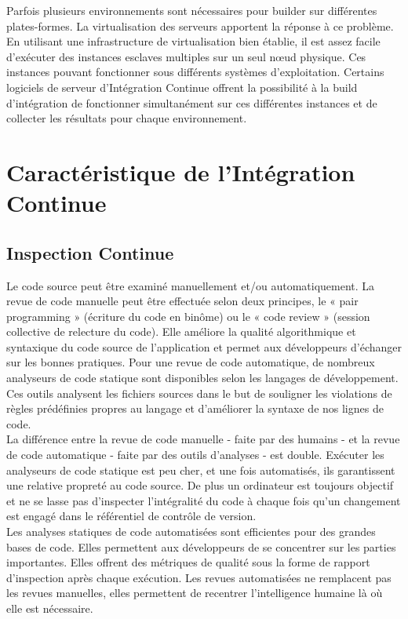     Parfois plusieurs environnements sont nécessaires pour builder sur différentes plates-formes. La virtualisation des serveurs apportent la réponse à ce problème. En utilisant une infrastructure de virtualisation bien établie, il est assez facile d’exécuter des instances esclaves multiples sur un seul nœud physique. Ces instances pouvant fonctionner sous différents systèmes d’exploitation. Certains logiciels de serveur d’Intégration Continue offrent la possibilité à la build d’intégration de fonctionner simultanément sur ces différentes instances et de collecter les résultats pour chaque environnement.\\

  \section{Caractéristique de l’Intégration Continue}\label{Features of Continuous Integration}
    \subsection{Inspection Continue}
    Le code source peut être examiné manuellement et/ou automatiquement. La revue de code manuelle peut être effectuée selon deux principes, le « \gls{pair programming} » (écriture du code en binôme) ou le « \gls{code review} » (session collective de relecture du code). Elle améliore la qualité algorithmique et syntaxique du code source de l’application et permet aux développeurs d’échanger sur les bonnes pratiques. Pour une revue de code automatique, de nombreux analyseurs de code statique sont disponibles selon les langages de développement. Ces outils analysent les fichiers sources dans le but de souligner les violations de règles prédéfinies propres au langage et d’améliorer la syntaxe de nos lignes de code.\\

    La différence entre la revue de code manuelle - faite par des humains - et la revue de code automatique - faite par des outils d’analyses - est double. Exécuter les analyseurs de code statique est peu cher, et une fois automatisés, ils garantissent une relative propreté au code source. De plus un ordinateur est toujours objectif et ne se lasse pas d’inspecter l’intégralité du code à chaque fois qu’un changement est engagé dans le référentiel de contrôle de version.\\

    Les analyses statiques de code automatisées sont efficientes pour des grandes bases de code. Elles permettent aux développeurs de se concentrer sur les parties importantes. Elles offrent des métriques de qualité sous la forme de rapport d’inspection après chaque exécution. Les revues automatisées ne remplacent pas les revues manuelles, elles permettent de recentrer l’intelligence humaine là où elle est nécessaire.\\

